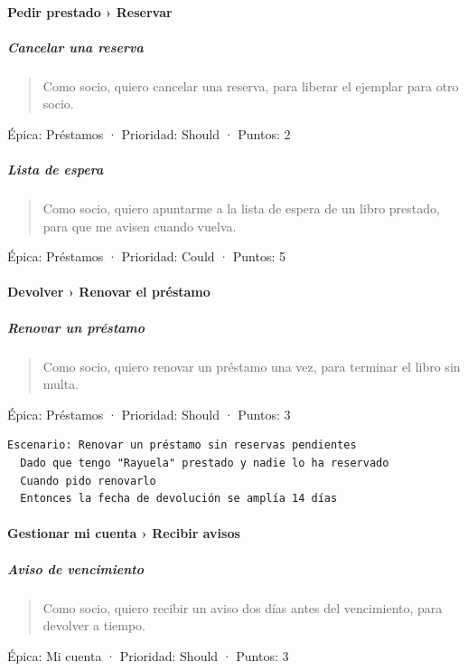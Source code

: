 \paragraph*{Pedir prestado › Reservar}

\subparagraph*{Cancelar una reserva}

\begin{quote}
Como socio, quiero cancelar una reserva, para liberar el ejemplar para otro socio.
\end{quote}

Épica: Préstamos · Prioridad: Should · Puntos: 2

\subparagraph*{Lista de espera}

\begin{quote}
Como socio, quiero apuntarme a la lista de espera de un libro prestado, para que me avisen cuando vuelva.
\end{quote}

Épica: Préstamos · Prioridad: Could · Puntos: 5

\paragraph*{Devolver › Renovar el préstamo}

\subparagraph*{Renovar un préstamo}

\begin{quote}
Como socio, quiero renovar un préstamo una vez, para terminar el libro sin multa.
\end{quote}

Épica: Préstamos · Prioridad: Should · Puntos: 3

\begin{Verbatim}[breaklines,fontsize=\small,frame=single,framerule=0.4pt,rulecolor=\color{black!25}]
Escenario: Renovar un préstamo sin reservas pendientes
  Dado que tengo "Rayuela" prestado y nadie lo ha reservado
  Cuando pido renovarlo
  Entonces la fecha de devolución se amplía 14 días
\end{Verbatim}

\paragraph*{Gestionar mi cuenta › Recibir avisos}

\subparagraph*{Aviso de vencimiento}

\begin{quote}
Como socio, quiero recibir un aviso dos días antes del vencimiento, para devolver a tiempo.
\end{quote}

Épica: Mi cuenta · Prioridad: Should · Puntos: 3
